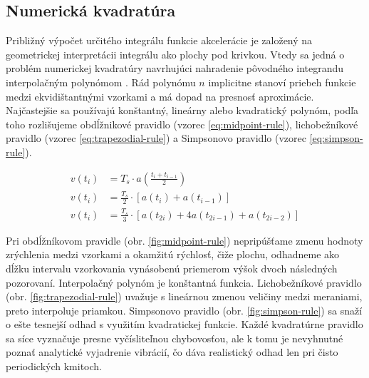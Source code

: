 \subsection{Numerická kvadratúra}
Približný výpočet určitého integrálu funkcie akcelerácie je založený na geometrickej interpretácii integrálu ako plochy pod krivkou.
Vtedy sa jedná o problém numerickej kvadratúry navrhujúci nahradenie pôvodného integrandu interpolačným polynómom
\cite{numerical-mathematics}. Rád polynómu $n$ implicitne stanoví priebeh funkcie medzi ekvidištantnými vzorkami a
má dopad na presnosť aproximácie. Najčastejšie sa používajú konštantný, lineárny alebo kvadratický
polynóm, podľa toho rozlišujeme obdĺžnikové pravidlo (vzorec \ref{eq:midpoint-rule}),
lichobežníkové pravidlo (vzorec \ref{eq:trapezodial-rule}) a Simpsonovo pravidlo (vzorec \ref{eq:simpson-rule}).
\begin{ceqn}
\begin{align}
   v(t_i) &= T_s \cdot a\left(\frac{t_i + t_{i-1}}{2}\right)  \label{eq:midpoint-rule} \\
   v(t_i) &= \frac{T_s}{2} \cdot [a(t_i) + a(t_{i-1})]		\label{eq:trapezodial-rule} \\
   v(t_i) &= \frac{T_s}{3} \cdot [a(t_{2i}) + 4a(t_{2i - 1}) + a(t_{2i - 2})] \label{eq:simpson-rule}
\end{align}
\end{ceqn}

Pri obdĺžníkovom pravidle (obr. \ref{fig:midpoint-rule}) nepripúšťame zmenu hodnoty zrýchlenia medzi vzorkami a okamžitú
rýchlosť, čiže plochu, odhadneme ako dĺžku intervalu vzorkovania vynásobenú priemerom výšok dvoch následných pozorovaní. Interpolačný
polynóm je konštantná funkcia. Lichobežníkové pravidlo (obr. \ref{fig:trapezodial-rule}) uvažuje s lineárnou zmenou veličiny
medzi meraniami, preto interpoluje priamkou. Simpsonovo pravidlo (obr. \ref{fig:simpson-rule}) sa snaží o ešte tesnejší odhad s
využitím kvadratickej funkcie. Každé kvadratúrne pravidlo sa síce vyznačuje presne vyčísliteľnou chybovosťou, ale k tomu je nevyhnutné
poznať analytické vyjadrenie vibrácií, čo dáva realistický odhad len pri čisto periodických kmitoch.

